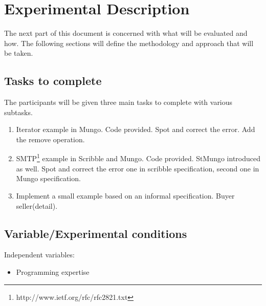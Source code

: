 \documentclass[11pt,notitlepage]{article}
\begin{document}
\section{Experimental Description}
The next part of this document is concerned with what will be evaluated and how.
The following sections will define the methodology and approach that will be taken.

\subsection{Tasks to complete}
The participants will be given three main tasks to complete with various subtasks.

\begin{enumerate}
  \item Iterator example in Mungo. Code provided. Spot and correct the error. Add the remove operation.
  \item SMTP\footnote{http://www.ietf.org/rfc/rfc2821.txt} example in Scribble and Mungo. Code provided. StMungo introduced as well. Spot and correct the error one in scribble specification, second one in Mungo specification.

  \item Implement a small example based on an informal specification. Buyer seller(detail).
\end{enumerate}

\subsection{Variable/Experimental conditions}




Independent variables:
\begin{itemize}
  \item Programming expertise
\end{itemize}
\end{document}
